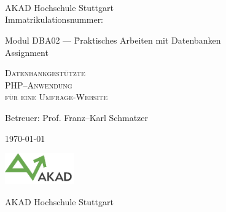 

\begin{titlepage}


\vspace{5cm}

\Name \\ 
\Strasse \\ 
\PlzOrt\\ 
\href{mailto:\Email}{\Email}

AKAD Hochschule Stuttgart\\
Immatrikulationsnummer: \Immatrikulationsnummer

\vfill

\begin{tabbing}
Modul DBA02 --- \=Praktisches Arbeiten mit Datenbanken\\ 
                \>Assignment  
\end{tabbing}
\LARGE
\textsc{Datenbankgestützte \\PHP--Anwendung\\für eine Umfrage-Website}\\

\vfill

\normalsize

Betreuer: Prof. Franz--Karl Schmatzer

\today %

\vfill

\includegraphics[width=3cm]{akad_logo.png}

AKAD Hochschule Stuttgart

\end{titlepage}



\normalsize
